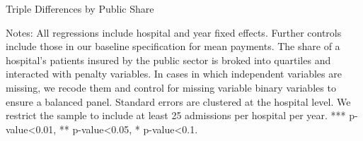 \documentclass[12pt]{article}
\begin{document}
\newpage
{}
\setlength{\captionmargin}{.5 \textwidth} \addtolength{\captionmargin}{-.5\wd\gfxbox}
\begin{table}[!h]
\centering
\caption{Triple Differences by Public Share}
\label{tab:publicshare}
\usebox{\gfxbox}
\par
\begin{minipage}{\wd\gfxbox}
\footnotesize
Notes: All regressions include hospital and year fixed effects.  Further controls include those in our baseline specification for mean payments.  The share of a hospital's patients insured by the public sector is broked into quartiles and interacted with penalty variables.  In cases in which independent variables are missing, we recode them and control for missing variable binary variables to ensure a balanced panel.  Standard errors are clustered at the hospital level.  We restrict the sample to include at least 25 admissions per hospital per year.  *** p-value<0.01, ** p-value<0.05, * p-value<0.1.
\end{minipage}
\end{table}
\end{document}
